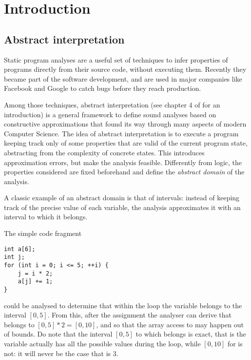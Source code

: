 \chapter{Introduction}

\section{Abstract interpretation}
Static program analyses are a useful set of techniques to infer properties of programs directly from their source code, without executing them. Recently they became part of the software development, and are used in major companies like Facebook \cite{distefano-static-analysis-fb} and Google \cite{static-analysis-google} to catch bugs before they reach production.

Among those techniques, abstract interpretation \cite{cousot-77,cousot-79,cousot-92} (see chapter 4 of \cite{principles-of-program-analysis-book} for an introduction) is a general framework to define sound analyses based on constructive approximations that found its way through many aspects of modern Computer Science.
The idea of abstract interpretation is to execute a program keeping track only of some properties that are valid of the current program state, abstracting from the complexity of concrete states. This introduces approximation errors, but make the analysis feasible. Differently from logic, the properties considered are fixed beforehand and define the \textit{abstract domain} of the analysis.

\begin{example}[Intervals]\label{intr:ex:intervals}
	A classic example of an abstract domain is that of intervals: instead of keeping track of the precise value of each variable, the analysis approximates it with an interval to which it belongs.

	The simple code fragment
	\begin{verbatim}
int a[6];
int j;
for (int i = 0; i <= 5; ++i) {
	j = i * 2;
	a[j] += 1;
}
	\end{verbatim}
	could be analysed to determine that within the loop the variable  belongs to the interval $[0, 5]$. From this, after the assignment  the analyser can derive that  belongs to $[0, 5] * 2 = [0, 10]$, and so that the array access to  may happen out of bounds.
	Do note that the interval $[0, 5]$ to which  belongs is exact, that is the variable actually has all the possible values during the loop, while $[0, 10]$ for  is not: it will never be the case that  is $3$.
\end{example}

